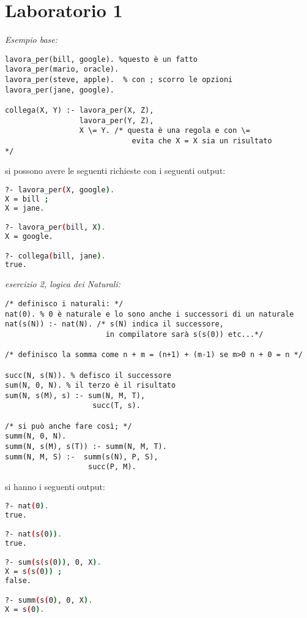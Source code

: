 \documentclass[a4paper,12pt, oneside]{book}
\begin{document}
\section{Laboratorio 1}
\begin{esercizio}
\textit{Esempio base:}
\begin{verbatim}
lavora_per(bill, google). %questo è un fatto
lavora_per(mario, oracle).
lavora_per(steve, apple).  % con ; scorro le opzioni
lavora_per(jane, google).

collega(X, Y) :- lavora_per(X, Z),
                 lavora_per(Y, Z),
                 X \= Y. /* questa è una regola e con \= 
                             evita che X = X sia un risultato                             */
\end{verbatim}
si possono avere le seguenti richieste con i seguenti output:
\begin{shaded}
\begin{lstlisting}[language=bash]
?- lavora_per(X, google).
X = bill ;
X = jane.

?- lavora_per(bill, X).
X = google.

?- collega(bill, jane).
true.
\end{lstlisting}
\end{shaded}
\end{esercizio}
\newpage
\begin{esercizio}
\textit{esercizio 2, logica dei Naturali:}
\begin{verbatim}
/* definisco i naturali: */
nat(0). % 0 è naturale e lo sono anche i successori di un naturale
nat(s(N)) :- nat(N). /* s(N) indica il successore, 
                       in compilatore sarà s(s(0)) etc...*/

/* definisco la somma come n + m = (n+1) + (m-1) se m>0 n + 0 = n */

succ(N, s(N)). % defisco il successore
sum(N, 0, N). % il terzo è il risultato
sum(N, s(M), s) :- sum(N, M, T),
                    succ(T, s).

/* si può anche fare così; */
summ(N, 0, N).
summ(N, s(M), s(T)) :- summ(N, M, T).
summ(N, M, S) :-  summ(s(N), P, S),
                   succ(P, M).
\end{verbatim}
si hanno i seguenti output:
\begin{shaded}
\begin{lstlisting}[language=bash]
?- nat(0).
true.

?- nat(s(0)).
true.

?- sum(s(s(0)), 0, X).
X = s(s(0)) ;
false.

?- summ(s(0), 0, X).
X = s(0).
\end{lstlisting}
\end{shaded}
\end{esercizio}
\end{document}

